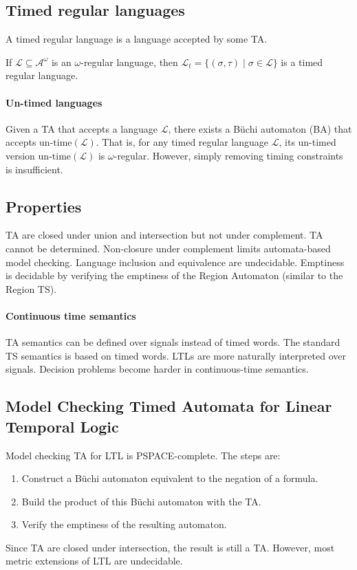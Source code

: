 \subsection{Timed regular languages}
\begin{definition}
    A timed regular language is a language accepted by some TA.
\end{definition}
\noindent If $\mathcal{L} \subseteq \mathcal{A}^\omega$ is an $\omega$-regular language, then $\mathcal{L}_t = \{ (\sigma, \tau) \mid \sigma \in \mathcal{L} \}$ is a timed regular language.

\paragraph*{Un-timed languages}
Given a TA that accepts a language $\mathcal{L}$, there exists a Büchi automaton (BA) that accepts $\text{un-time}(\mathcal{L})$.
That is, for any timed regular language $\mathcal{L}$, its un-timed version $\text{un-time}(\mathcal{L})$ is $\omega$-regular.
However, simply removing timing constraints is insufficient. 

\subsection{Properties}
TA are closed under union and intersection but not under complement.
TA cannot be determined.
Non-closure under complement limits automata-based model checking.
Language inclusion and equivalence are undecidable.
Emptiness is decidable by verifying the emptiness of the Region Automaton (similar to the Region TS).

\paragraph*{Continuous time semantics}
TA semantics can be defined over signals instead of timed words.
The standard TS semantics is based on timed words.
LTLs are more naturally interpreted over signals.
Decision problems become harder in continuous-time semantics.

\subsection{Model Checking Timed Automata for Linear Temporal Logic}
Model checking TA for LTL is PSPACE-complete.
The steps are: 
\begin{enumerate}
    \item Construct a Büchi automaton equivalent to the negation of a formula.
    \item Build the product of this Büchi automaton with the TA.
    \item Verify the emptiness of the resulting automaton.
\end{enumerate}
\noindent Since TA are closed under intersection, the result is still a TA.
However, most metric extensions of LTL are undecidable.